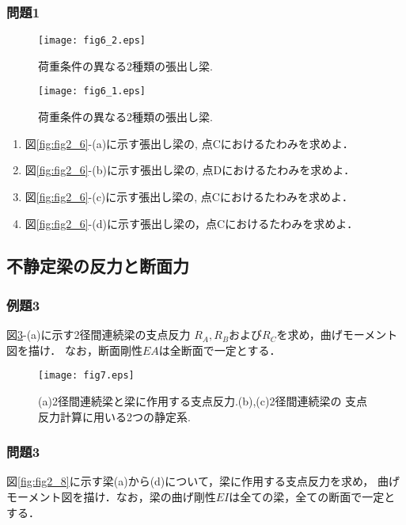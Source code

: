 ﻿\documentclass[10pt,a4j]{jarticle}
\begin{document}
\subsubsection{問題1}
\begin{figure}[h]
	\begin{center}
	\texttt{[image: fig6\_2.eps]} 
	\end{center}
	\caption{荷重条件の異なる2種類の張出し梁.} 
	\label{fig:fig6_2}
\end{figure}
\begin{figure}[h]
	\begin{center}
	\texttt{[image: fig6\_1.eps]} 
	\end{center}
	\caption{荷重条件の異なる2種類の張出し梁.} 
	\label{fig:fig6_1}
\end{figure}
\begin{enumerate}
\item
	図\ref{fig:fig2_6}-(a)に示す張出し梁の, 点Cにおけるたわみを求めよ．
\item
	図\ref{fig:fig2_6}-(b)に示す張出し梁の, 点Dにおけるたわみを求めよ．
\item
	図\ref{fig:fig2_6}-(c)に示す張出し梁の, 点Cにおけるたわみを求めよ．
\item
	図\ref{fig:fig2_6}-(d)に示す張出し梁の，点Cにおけるたわみを求めよ．
\end{enumerate}
\subsection{不静定梁の反力と断面力}
\subsubsection{例題3}
図\ref{fig:fig2_7}-(a)に示す2径間連続梁の支点反力
$R_A, R_B$および$R_C$を求め，曲げモーメント図を描け．
なお，断面剛性$EA$は全断面で一定とする．
\begin{figure}
	\begin{center}
	\texttt{[image: fig7.eps]} 
	\end{center}
	\caption{(a)2径間連続梁と梁に作用する支点反力.(b),(c)2径間連続梁の
	支点反力計算に用いる2つの静定系.} 
	\label{fig:fig2_7}
\end{figure}
\subsubsection{問題3}
図\ref{fig:fig2_8}に示す梁(a)から(d)について，梁に作用する支点反力を求め，
曲げモーメント図を描け．なお，梁の曲げ剛性$EI$は全ての梁，全ての断面で一定とする．
\end{document}
